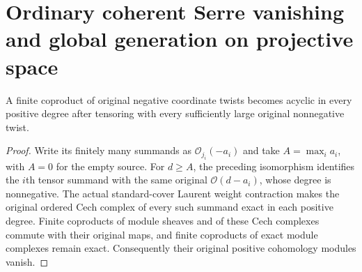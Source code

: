 \section{Ordinary coherent Serre vanishing and global generation on projective space}

\begin{lemma}
\label{lem:coherent-projective-negative-presentation-acyclic}
\leanok
A finite coproduct of original negative coordinate twists becomes acyclic
in every positive degree after tensoring with every sufficiently large
original nonnegative twist.
\end{lemma}
\begin{proof}
Write its finitely many summands as $\mathcal O_{j_i}(-a_i)$ and take
$A=\max_i a_i$, with $A=0$ for the empty source. For $d\ge A$, the preceding
isomorphism identifies the $i$th tensor summand with the same original
$\mathcal O(d-a_i)$, whose degree is nonnegative. The actual standard-cover
Laurent weight contraction makes the original ordered Cech complex of
every such summand exact in each positive degree. Finite coproducts of
module sheaves and of these Cech complexes commute with their original
maps, and finite coproducts of exact module complexes remain exact.
Consequently their original positive cohomology modules vanish.
\end{proof}

